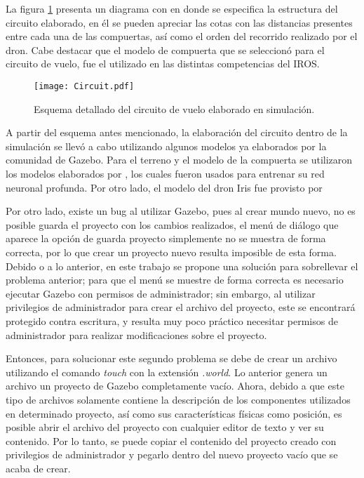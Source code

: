 La figura \ref{fig:Circuit} presenta un diagrama con en donde se especifica la estructura del circuito elaborado, en él se pueden apreciar las cotas con las distancias presentes entre cada una de las compuertas, así como el orden del recorrido realizado por el dron. Cabe destacar que el modelo de compuerta que se seleccionó para el circuito de vuelo, fue el utilizado en las distintas competencias del IROS.

\begin{figure}[ht]
    \centering
    \texttt{[image: Circuit.pdf]}
    \caption{Esquema detallado del circuito de vuelo elaborado en simulación.}
    \label{fig:Circuit}
\end{figure}

A partir del esquema antes mencionado, la elaboración del circuito dentro de la simulación se llevó a cabo utilizando algunos modelos ya elaborados por la comunidad de Gazebo. Para el terreno y el modelo de la compuerta se utilizaron los modelos elaborados por \cite{rojas2020deeppilot}, los cuales fueron usados para entrenar su red neuronal profunda. Por otro lado, el modelo del dron Iris fue provisto por

Por otro lado, existe un bug al utilizar Gazebo, pues al crear mundo nuevo, no es posible guarda el proyecto con los cambios realizados, el menú de diálogo que aparece la opción de guarda proyecto simplemente no se muestra de forma correcta, por lo que crear un proyecto nuevo resulta imposible de esta forma. Debido o a lo anterior, en este trabajo se propone una solución para sobrellevar el problema anterior; para que el menú se muestre de forma correcta es necesario ejecutar Gazebo con permisos de administrador; sin embargo, al utilizar privilegios de administrador para crear el archivo del proyecto, este se encontrará protegido contra escritura, y resulta muy poco práctico necesitar permisos de administrador para realizar modificaciones sobre el proyecto.

Entonces, para solucionar este segundo problema se debe de crear un archivo utilizando el comando \textit{touch} con la extensión \textit{.world}. Lo anterior genera un archivo un proyecto de Gazebo completamente vacío. Ahora, debido a que este tipo de archivos solamente contiene la descripción de los componentes utilizados en determinado proyecto, así como sus características físicas como posición, es posible abrir el archivo del proyecto con cualquier editor de texto y ver su contenido. Por lo tanto, se puede copiar el contenido del proyecto creado con privilegios de administrador y pegarlo dentro del nuevo proyecto vacío que se acaba de crear.


